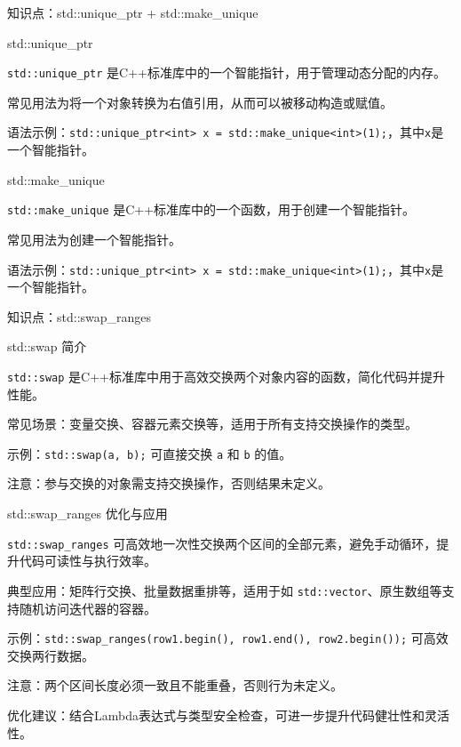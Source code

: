 \documentclass[UTF8,aspectratio=169]{beamer}
\begin{document}
\begin{frame}{知识点：std::unique_ptr + std::make_unique}
    \begin{ytublock}{std::unique_ptr}
        \item \texttt{std::unique\_ptr} 是C++标准库中的一个智能指针，用于管理动态分配的内存。
        \item 常见用法为将一个对象转换为右值引用，从而可以被移动构造或赋值。
        \item 语法示例：\texttt{std::unique\_ptr<int> x = std::make\_unique<int>(1);}，其中\texttt{x}是一个智能指针。
    \end{ytublock}
    \begin{ytublock}{std::make_unique}
        \item \texttt{std::make\_unique} 是C++标准库中的一个函数，用于创建一个智能指针。
        \item 常见用法为创建一个智能指针。
        \item 语法示例：\texttt{std::unique\_ptr<int> x = std::make\_unique<int>(1);}，其中\texttt{x}是一个智能指针。
    \end{ytublock}
\end{frame}

\begin{frame}{知识点：std::swap\_ranges}
    \begin{ytublock}{std::swap 简介}
        \item \texttt{std::swap} 是C++标准库中用于高效交换两个对象内容的函数，简化代码并提升性能。
        \item 常见场景：变量交换、容器元素交换等，适用于所有支持交换操作的类型。
        \item 示例：\texttt{std::swap(a, b);} 可直接交换 \texttt{a} 和 \texttt{b} 的值。
        \item 注意：参与交换的对象需支持交换操作，否则结果未定义。
    \end{ytublock}
    \begin{ytublock}{std::swap\_ranges 优化与应用}
        \item \texttt{std::swap\_ranges} 可高效地一次性交换两个区间的全部元素，避免手动循环，提升代码可读性与执行效率。
        \item 典型应用：矩阵行交换、批量数据重排等，适用于如 \texttt{std::vector}、原生数组等支持随机访问迭代器的容器。
        \item 示例：\texttt{std::swap\_ranges(row1.begin(), row1.end(), row2.begin());} 可高效交换两行数据。
        \item 注意：两个区间长度必须一致且不能重叠，否则行为未定义。
        \item 优化建议：结合Lambda表达式与类型安全检查，可进一步提升代码健壮性和灵活性。
    \end{ytublock}
\end{frame}
\end{document}
